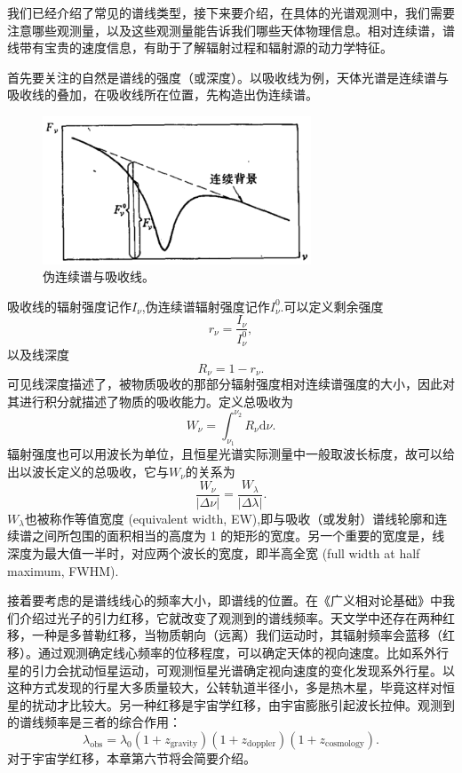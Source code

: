 \documentclass[../天体物理基础.tex]{subfiles}
\begin{document}
我们已经介绍了常见的谱线类型，接下来要介绍，在具体的光谱观测中，我们需要注意哪些观测量，以及这些观测量能告诉我们哪些天体物理信息。相对连续谱，谱线带有宝贵的速度信息，有助于了解辐射过程和辐射源的动力学特征。

首先要关注的自然是谱线的强度（或深度）。以吸收线为例，天体光谱是连续谱与吸收线的叠加，在吸收线所在位置，先构造出伪连续谱。
\begin{figure}[!htbp]
\centering
\includegraphics[width=8cm]{figures/figure1_13.png}
\captionsetup{justification=raggedright, singlelinecheck=false}
\caption{伪连续谱与吸收线。}
\label{伪连续谱与吸收线。}
\end{figure}

吸收线的辐射强度记作$I_{\nu}$,伪连续谱辐射强度记作$I_{\nu}^{0}$.可以定义剩余强度
\begin{equation}
r_{\nu}=\frac{I_{\nu}}{I_{\nu}^{0}},
\end{equation}
以及线深度
\begin{equation}
R_{\nu}=1-r_{\nu}.
\end{equation}
可见线深度描述了，被物质吸收的那部分辐射强度相对连续谱强度的大小，因此对其进行积分就描述了物质的吸收能力。定义总吸收为
\begin{equation}
W_{\nu}=\int_{\nu_{1}}^{\nu_{2}}R_{\nu}\mathrm{d}\nu.
\end{equation}
辐射强度也可以用波长为单位，且恒星光谱实际测量中一般取波长标度，故可以给出以波长定义的总吸收，它与$W_{\nu}$的关系为
\begin{equation}
\frac{W_{\nu}}{\left\vert{}\Delta{}\nu\right\vert{}}=\frac{W_{\lambda}}{\left\vert{}\Delta{}\lambda\right\vert{}}.
\end{equation}
$W_{\lambda}$也被称作等值宽度 (equivalent width, EW),即与吸收（或发射）谱线轮廓和连续谱之间所包围的面积相当的高度为 1 的矩形的宽度。另一个重要的宽度是，线深度为最大值一半时，对应两个波长的宽度，即半高全宽 (full width at half maximum, FWHM).

接着要考虑的是谱线线心的频率大小，即谱线的位置。在《广义相对论基础》中我们介绍过光子的引力红移，它就改变了观测到的谱线频率。天文学中还存在两种红移，一种是多普勒红移，当物质朝向（远离）我们运动时，其辐射频率会蓝移（红移）。通过观测确定线心频率的位移程度，可以确定天体的视向速度。比如系外行星的引力会扰动恒星运动，可观测恒星光谱确定视向速度的变化发现系外行星。以这种方式发现的行星大多质量较大，公转轨道半径小，多是热木星，毕竟这样对恒星的扰动才比较大。另一种红移是宇宙学红移，由宇宙膨胀引起波长拉伸。观测到的谱线频率是三者的综合作用：
\begin{equation}
\lambda_{\text{obs}}=\lambda_{0}\left(1+z_{\text{gravity}}\right)\left(1+z_{\text{doppler}}\right)\left(1+z_{\text{cosmology}}\right).
\end{equation}
对于宇宙学红移，本章第六节将会简要介绍。
\end{document}
